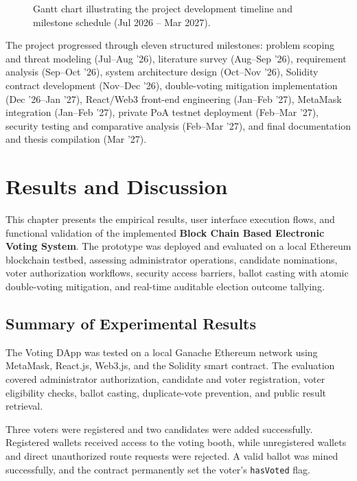 \documentclass[12pt,a4paper]{report}
\begin{document}
\begin{figure}[H]
\centering
{}
\caption{Gantt chart illustrating the project development timeline and milestone schedule (Jul 2026 -- Mar 2027).}
\label{fig:gantt_chart}
\end{figure}

The project progressed through eleven structured milestones: problem scoping and threat modeling (Jul--Aug '26), literature survey (Aug--Sep '26), requirement analysis (Sep--Oct '26), system architecture design (Oct--Nov '26), Solidity contract development (Nov--Dec '26), double-voting mitigation implementation (Dec '26--Jan '27), React/Web3 front-end engineering (Jan--Feb '27), MetaMask integration (Jan--Feb '27), private PoA testnet deployment (Feb--Mar '27), security testing and comparative analysis (Feb--Mar '27), and final documentation and thesis compilation (Mar '27).

\chapter{Results and Discussion}

This chapter presents the empirical results, user interface execution flows, and functional validation of the implemented \textbf{Block Chain Based Electronic Voting System}. The prototype was deployed and evaluated on a local Ethereum blockchain testbed, assessing administrator operations, candidate nominations, voter authorization workflows, security access barriers, ballot casting with atomic double-voting mitigation, and real-time auditable election outcome tallying.

\section{Summary of Experimental Results}
The Voting DApp was tested on a local Ganache Ethereum network using MetaMask, React.js, Web3.js, and the Solidity smart contract. The evaluation covered administrator authorization, candidate and voter registration, voter eligibility checks, ballot casting, duplicate-vote prevention, and public result retrieval.

Three voters were registered and two candidates were added successfully. Registered wallets received access to the voting booth, while unregistered wallets and direct unauthorized route requests were rejected. A valid ballot was mined successfully, and the contract permanently set the voter's \texttt{hasVoted} flag.
\end{document}
